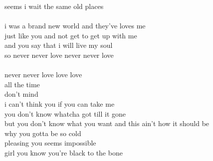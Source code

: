 \documentclass[conference]{IEEEtran}
\begin{document}
seems i wait the same old places \\
 \\
i was a brand new world and they've loves me \\
just like you and not get to get up with me \\
and you say that i will live my soul \\
so never never love never never love \\
 \\
never never love love love \\
all the time \\
don't mind \\
i can't think you if you can take me \\
you don't know whatcha got till it gone \\
but you don't know what you want and this ain't how it should be \\
why you gotta be so cold \\
pleasing you seems impossible \\
girl you know you're black to the bone \\
\end{document}
